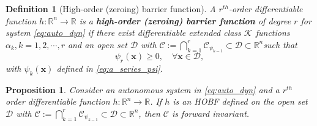 \documentclass[letterpaper, 10 pt, journal, twoside]{IEEEtran}
\theoremstyle{plain}
\newtheorem{definition}{Definition}
\newtheorem{proposition}{Proposition}
\newcommand{\myvar}[1]{\bm{#1}}
\newcommand{\myset}[1]{\mathscr{#1}}
\begin{document}
\begin{definition}[High-order (zeroing) barrier function] \label{def:hobf}
A $r^{th}$-order differentiable function $ h:\mathbb{R}^n \to \mathbb{R} $ is a \textbf{high-order (zeroing) barrier function} of degree $ r $ for system \eqref{eq:auto_dyn} if there exist differentiable extended class $ \mathcal{K} $ functions $ \alpha_{k}, k = 1,2,\cdots,r $ and an open set $\myset{D}$ with $\myset{C}:=\bigcap_{k = 1}^{r} \myset{C}_{\psi_{k-1}} \subset \myset{D} \subset \mathbb{R}^n $such that
 	\begin{equation}\label{eq:hobf_def}
 	\psi_r(\myvar{x}) \ge 0, \quad \forall \myvar{x} \in \myset{D},
 	\end{equation}
 	with $\psi_k(\myvar{x})$ defined in \eqref{eq:a_series_psi}. 
\end{definition}

\begin{proposition} \label{prop:hobf}
 Consider an autonomous system in \eqref{eq:auto_dyn} and a $r^{th}$ order differentiable function $h:\mathbb{R}^n \to \mathbb{R}$. If $h$ is an HOBF defined on the open set $\myset{D} $ with $ \myset{C}:= \bigcap_{k = 1}^{r} \myset{C}_{\psi_{k-1}} \subset \myset{D}\subset \mathbb{R}^n$, then $\myset{C}$ is forward invariant. 
\end{proposition}
\end{document}
